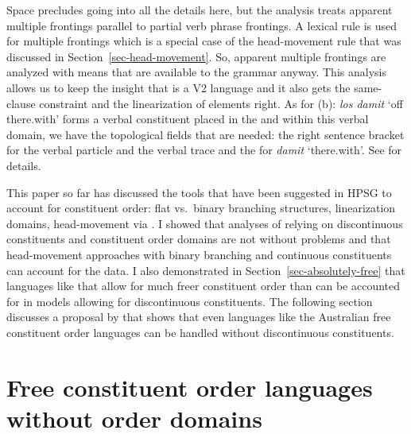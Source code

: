 \documentclass[output=paper
	        ,collection
	        ,collectionchapter
 	        ,biblatex
                ,babelshorthands
                ,newtxmath
                ,draftmode
                ,colorlinks, citecolor=brown
]{langscibook}
\begin{document}
\zl 
Space precludes going into all the details here, but the analysis treats apparent multiple frontings parallel to
partial verb phrase frontings. A lexical rule is used for multiple frontings which is a special case
of the head-movement rule that was discussed in Section~\ref{sec-head-movement}. So, apparent
multiple frontings are analyzed with means that are available to the grammar anyway. This analysis
allows us to keep the insight that  is a V2 language and it also gets the same-clause constraint
and the linearization of elements right. As for (b): \emph{los damit} `off there.with' forms
a verbal constituent placed in the \vf and within this verbal domain, we have the topological fields that are needed:
the right sentence bracket for the verbal particle and the verbal trace and the \nf for
\emph{damit} `there.with'. See  for details.




This paper so far has discussed the tools that have been suggested in HPSG to account for constituent
order: flat vs.\ binary branching structures, linearization domains, head-movement via \dsl. I
showed that analyses of  relying on discontinuous constituents and constituent order domains
are not without problems and that head-movement approaches with binary branching and continuous
constituents can account for the data. I also demonstrated in Section~\ref{sec-absolutely-free} that
languages like  that allow for much freer constituent order than  can be accounted
for in models allowing for discontinuous constituents. The following section discusses a proposal by \citet{Bender2008a} that shows that even
languages like the Australian free constituent order languages can be handled without discontinuous constituents.

\section{Free constituent order languages without order domains}
\label{sec-free-without-domains}
\end{document}
